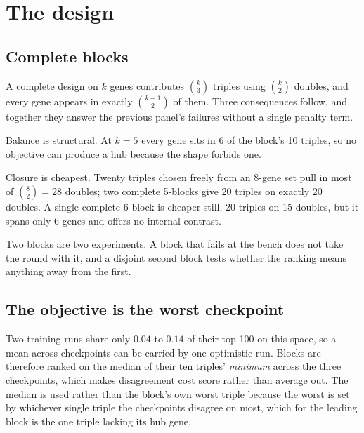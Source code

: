 \section{The design}\label{sec:design}

\subsection{Complete blocks}

A complete design on $k$ genes contributes $\binom{k}{3}$ triples using
$\binom{k}{2}$ doubles, and every gene appears in exactly $\binom{k-1}{2}$ of
them. Three consequences follow, and together they answer the previous panel's
failures without a single penalty term.

Balance is structural. At $k = 5$ every gene sits in 6 of the block's 10 triples,
so no objective can produce a hub because the shape forbids one.

Closure is cheapest. Twenty triples chosen freely from an 8-gene set pull in most
of $\binom{8}{2} = 28$ doubles; two complete 5-blocks give 20 triples on exactly
20 doubles. A single complete 6-block is cheaper still, 20 triples on 15 doubles,
but it spans only 6 genes and offers no internal contrast.

Two blocks are two experiments. A block that fails at the bench does not take the
round with it, and a disjoint second block tests whether the ranking means
anything away from the first.

\subsection{The objective is the worst checkpoint}

Two training runs share only $0.04$ to $0.14$ of their top 100 on this space, so
a mean across checkpoints can be carried by one optimistic run. Blocks are
therefore ranked on the median of their ten triples' \emph{minimum} across the
three checkpoints, which makes disagreement cost score rather than average out.
The median is used rather than the block's own worst triple because the worst is
set by whichever single triple the checkpoints disagree on most, which for the
leading block is the one triple lacking its hub gene.

